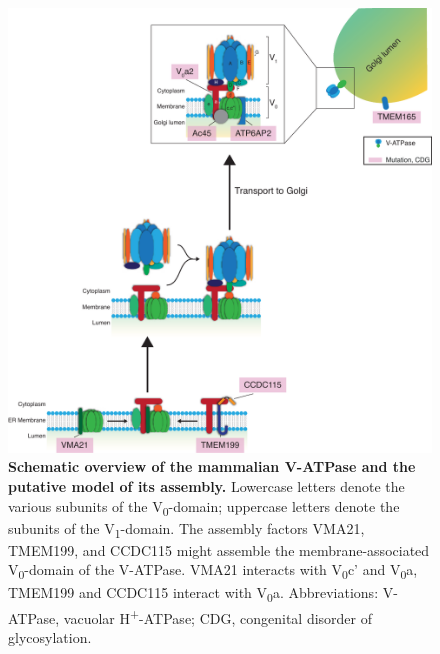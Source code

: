 \begin{figure}
    \includegraphics[keepaspectratio=true,width=\textwidth,height=\textheight]{chapters/chapter2/chapter2_Figure2}
    \caption{\textbf{Schematic overview of the mammalian V-ATPase and the putative model of its assembly.} Lowercase letters denote the various subunits of the V\textsubscript{0}-domain; uppercase letters denote the subunits of the V\textsubscript{1}-domain. The assembly factors VMA21, TMEM199, and CCDC115 might assemble the membrane-associated V\textsubscript{0}-domain of the V-ATPase. VMA21 interacts with V\textsubscript{0}c’ and V\textsubscript{0}a\cite{davis-kaplan_pkr1_2006,malkus_role_2004,esmail_n-linked_2016,esmail_n-linked_2017}, TMEM199 and CCDC115 interact with V\textsubscript{0}a\cite{graham_structure_2003}. Abbreviations: V-ATPase, vacuolar H\textsuperscript{+}-ATPase; CDG, congenital disorder of glycosylation.}
    \label{fig:ch2fig2}
\end{figure}

